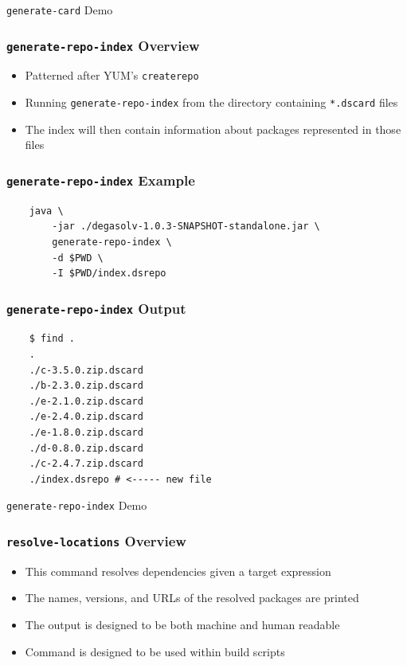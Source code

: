 \documentclass{beamer}
\begin{document}
\begin{frame}
  \centerline{\color{blue}\Large \texttt{generate-card} Demo}
\end{frame}
\begin{frame}
  \frametitle{\texttt{generate-repo-index} Overview}
  \begin{itemize}
  \item Patterned after YUM's \texttt{createrepo}
  \item Running \texttt{generate-repo-index} from the directory containing \texttt{*.dscard}
    files
  \item The index will then contain information about packages represented in those
    files
  \end{itemize}
\end{frame}
\begin{frame}[fragile]
  \frametitle{\texttt{generate-repo-index} Example}
\begin{verbatim}
    java \
        -jar ./degasolv-1.0.3-SNAPSHOT-standalone.jar \
        generate-repo-index \
        -d $PWD \
        -I $PWD/index.dsrepo
\end{verbatim}
\end{frame}
\begin{frame}[fragile]
  \frametitle{\texttt{generate-repo-index} Output}
\begin{verbatim}
    $ find .
    .
    ./c-3.5.0.zip.dscard
    ./b-2.3.0.zip.dscard
    ./e-2.1.0.zip.dscard
    ./e-2.4.0.zip.dscard
    ./e-1.8.0.zip.dscard
    ./d-0.8.0.zip.dscard
    ./c-2.4.7.zip.dscard
    ./index.dsrepo # <----- new file
\end{verbatim}
\end{frame}
\begin{frame}
  \centerline{\color{blue}\Large \texttt{generate-repo-index} Demo}
\end{frame}
\begin{frame}
  \frametitle{\texttt{resolve-locations} Overview}
  \begin{itemize}
  \item This command resolves dependencies given a target expression
  \item The names, versions, and URLs of the resolved packages are printed
  \item The output is designed to be both machine and human readable
  \item Command is designed to be used within build scripts
  \end{itemize}
\end{frame}
\end{document}
